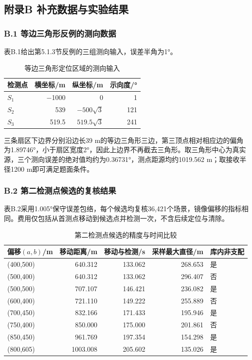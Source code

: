 \documentclass[UTF8,fontset=none,zihao=-4,a4paper]{ctexart}
\begin{document}
\setcounter{table}{0}
\renewcommand{\thetable}{B.\arabic{table}}
\renewcommand{\theHtable}{appendix.B.\arabic{table}}
\subsection{附录B 补充数据与实验结果}\label{appendix-B}

\subsubsection{B.1 等边三角形反例的测向数据}\label{sec-B-1}

表B.1给出第5.1.3节反例的三组测向输入，误差半角为1°。

\begin{table}[H]
\centering\small
\caption{等边三角形定位区域的测向输入}\label{tab-B-1}
\begin{tabular}{@{}lrrr@{}}
\toprule
检测点 & 横坐标/m & 纵坐标/m & 示向度/°\tabularnewline
\midrule

\(S_1\) & −1000 & 0 & 1\tabularnewline
\(S_2\) & 539 & \(-500\sqrt3\) & 121\tabularnewline
\(S_3\) & 519.5 & \(519.5\sqrt3\) & 241\tabularnewline
\bottomrule
\end{tabular}
\end{table}

三条扇区下边界分别沿边长39 m的等边三角形三边，第三顶点相对相应边的偏角为1.89746°，小于扇区宽度2°，因此上边界不再截去三角形。取三角形中心为真实源，三个测向误差的绝对值均约为0.36731°，测点距源均约1019.562 m；取接收半径1200 m即可满足题面条件。

\subsubsection{B.2 第二检测点候选的复核结果}\label{sec-B-2}

表B.2采用1.005°保守误差包络，每个候选均复核36,421个场景，镜像偏移的指标相同。费用仅包括从首测点移动到候选点并检测一次，不含后续定位与清除。

\begin{table}[H]
\centering\small
\caption{第二检测点候选的精度与时间比较}\label{tab-B-2}
\begin{tabular}{@{}lrrrl@{}}
\toprule
偏移\((a,b)\)/m & 移动距离/m & 移动与检测/s & 采样最大直径/m & 库内非支配\tabularnewline
\midrule

(400,500) & 640.312 & 133.062 & 268.653 & 是\tabularnewline
(500,400) & 640.312 & 133.062 & 296.407 & 否\tabularnewline
(500,500) & 707.107 & 146.421 & 236.082 & 是\tabularnewline
(600,400) & 721.110 & 149.222 & 255.889 & 否\tabularnewline
(700,450) & 832.166 & 171.433 & 195.946 & 是\tabularnewline
(750,400) & 850.000 & 175.000 & 201.861 & 否\tabularnewline
(850,450) & 961.769 & 197.354 & 154.298 & 是\tabularnewline
(800,605) & 1003.008 & 205.602 & 135.026 & 是\tabularnewline
\bottomrule
\end{tabular}
\end{table}
\end{document}

